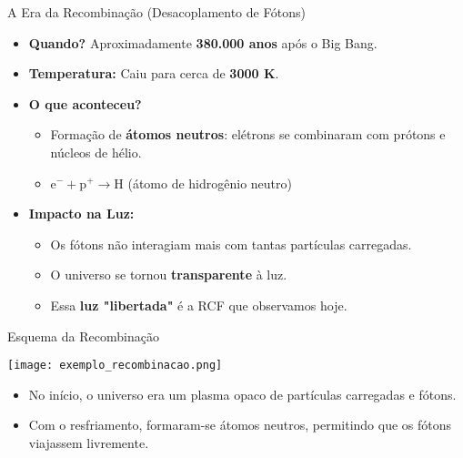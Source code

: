 \documentclass{beamer}
\begin{document}
\begin{frame}{A Era da Recombinação (Desacoplamento de Fótons)}
    \begin{itemize}
        \item \textbf{Quando?} Aproximadamente \textbf{380.000 anos} após o Big Bang.
        \item \textbf{Temperatura:} Caiu para cerca de \textbf{3000 K}.
        \item \textbf{O que aconteceu?}
        \begin{itemize}
            \item Formação de \textbf{átomos neutros}: elétrons se combinaram com prótons e núcleos de hélio.
            \item $\text{e}^- + \text{p}^+ \rightarrow \text{H}$ (átomo de hidrogênio neutro)
        \end{itemize}
        \item \textbf{Impacto na Luz:}
        \begin{itemize}
            \item Os fótons não interagiam mais com tantas partículas carregadas.
            \item O universo se tornou \textbf{transparente} à luz.
            \item Essa \textbf{luz "libertada"} é a RCF que observamos hoje.
        \end{itemize}
    \end{itemize}
\end{frame}

\begin{frame}{Esquema da Recombinação}
    \begin{center}
        \texttt{[image: exemplo\_recombinacao.png]} 
        
    \end{center}
    
    \begin{itemize}
        \item No início, o universo era um plasma opaco de partículas carregadas e fótons.
        \item Com o resfriamento, formaram-se átomos neutros, permitindo que os fótons viajassem livremente.
    \end{itemize}
    
\end{frame}


\end{document}
